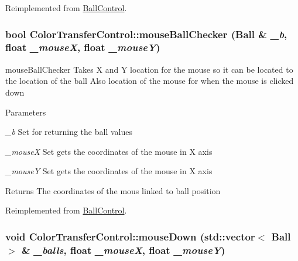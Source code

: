 Reimplemented from \hyperlink{classBallControl_af84eaea1411dd325db8e94c7adc5d9a3}{BallControl}.\hypertarget{classColorTransferControl_ab4db8c5f585065d55e4beaef3d51b940}{
\subsubsection[{mouseBallChecker}]{\setlength{\rightskip}{0pt plus 5cm}bool ColorTransferControl::mouseBallChecker ({\bf Ball} \& {\em \_\-b}, \/  float {\em \_\-mouseX}, \/  float {\em \_\-mouseY})}}
\label{classColorTransferControl_ab4db8c5f585065d55e4beaef3d51b940}


mouseBallChecker Takes X and Y location for the mouse so it can be located to the location of the ball Also location of the mouse for when the mouse is clicked down 
\begin{DoxyParams}{Parameters}
\item[{\em \_\-b}]Set for returning the ball values \item[{\em \_\-mouseX}]Set gets the coordinates of the mouse in X axis \item[{\em \_\-mouseY}]Set gets the coordinates of the mouse in X axis \end{DoxyParams}
\begin{DoxyReturn}{Returns}
The coordinates of the mous linked to ball position 
\end{DoxyReturn}


Reimplemented from \hyperlink{classBallControl_a85fce07250ce552fd098b6c74d34c588}{BallControl}.\hypertarget{classColorTransferControl_ac0acd46f1620035c8d7a830206fce6b8}{
\subsubsection[{mouseDown}]{\setlength{\rightskip}{0pt plus 5cm}void ColorTransferControl::mouseDown (std::vector$<$ {\bf Ball} $>$ \& {\em \_\-balls}, \/  float {\em \_\-mouseX}, \/  float {\em \_\-mouseY})}}
\label{classColorTransferControl_ac0acd46f1620035c8d7a830206fce6b8}


